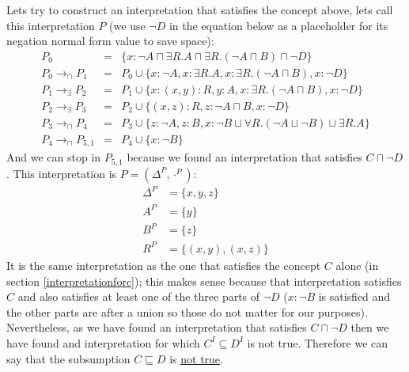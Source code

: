 \documentclass[a4paper,12pt]{article}
\begin{document}
Lets try to construct an interpretation that satisfies the concept above, lets
call this interpretation $P$ (we use $ \neg D $ in the equation below as a
placeholder for its negation normal form value to save space):
\begin{eqnarray*}
P_0 &=& \{ x : \neg A \sqcap \exists R.A
               \sqcap \exists R.(\neg A \sqcap B) \sqcap \neg D \}\\
P_0 \to_\sqcap P_1 &=& P_0 \cup
                       \{ x : \neg A, x : \exists R.A
                        , x : \exists R.(\neg A \sqcap B), x : \neg D\}\\
P_1 \to_\exists P_2 &=& P_1 \cup
                        \{ x : (x,y) : R, y : A
                         , x : \exists R.(\neg A \sqcap B), x : \neg D\}\\
P_2 \to_\exists P_3 &=& P_2 \cup
                        \{ (x,z) : R, z : \neg A \sqcap B, x : \neg D\}\\
P_3 \to_\sqcap P_4 &=& P_3 \cup
                           \{ z : \neg A, z : B
                            , x : \neg B \sqcup
                                  \forall R.(\neg A \sqcup \neg B)
                                  \sqcup \exists R.A\}\\
P_4 \to_\sqcap P_{5,1} &=& P_4 \cup \{ x : \neg B \}
\end{eqnarray*}
And we can stop in $ P_{5,1} $ because we found an interpretation that
satisfies $ C \sqcap \neg D $.  This interpretation is $ P = (\Delta^P,
\cdot^P) $:
\begin{align*}
\Delta^P &= \{x,y,z\}\\
     A^P &= \{y\}\\
     B^P &= \{z\}\\
     R^P &= \{(x,y),(x,z)\}
\end{align*}
It is the same interpretation as the one that satisfies the concept $C$ alone
(in section \ref{interpretationforc}); this makes sense because that
interpretation satisfies $C$ and also satisfies at least one of the three parts
of $\neg D$ ($ x : \neg B $ is satisfied and the other parts are after a union
so those do not matter for our purposes).  Nevertheless, as we have found an
interpretation that satisfies $ C \sqcap \neg D $ then we have found and
interpretation for which $ C^I \subseteq D^I $ is not true.  Therefore we can
say that the subsumption $ C \sqsubseteq D $ is \underline{not true}.
\end{document}
